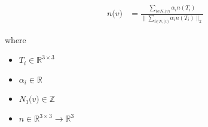\documentclass[12pt]{article}
\begin{document}
\begin{align*}
\textit{n(v)} & = \frac{\sum_{\textit{i} \in \textit{N₁(v)} } \textit{α}_{ \textit{i} }\textit{n}\left( \textit{T}_{ \textit{i} } \right)}{\|\sum_{\textit{i} \in \textit{N₁(v)} } \textit{α}_{ \textit{i} }\textit{n}\left( \textit{T}_{ \textit{i} } \right)\|_2}
\end{align*}

where
\begin{itemize}
\item $\textit{T}_{\textit{i}} \in \mathbb{R}^{ 3 \times 3 }$
\item $\textit{α}_{\textit{i}} \in \mathbb{{R}}$
\item $\textit{N₁(v)} \in \mathbb{Z}$
\item $\textit{n} \in \mathbb{R}^{ 3 \times 3 }\rightarrow \mathbb{R}^{ 3}$
\end{itemize}
\end{document}
